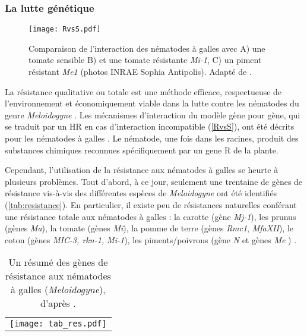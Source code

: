 	
\subsubsection{La lutte génétique}


	\begin{figure}[H]
		\centering \texttt{[image: RvsS.pdf]}
		\caption[Comparaison de
l’interaction des nématodes
à galles entre une plante
sensible et résistante]{ Comparaison de
l’interaction des nématodes
à galles avec A) une tomate
sensible B)  et une tomate
résistante   \textit{Mi-1}, C) un piment résistant \textit{Me1}  (photos
INRAE Sophia Antipolis).  Adapté de \citet{Djian-Caporalino2015}.}
 		\label{RvsS}
	\end{figure}




	La résistance qualitative ou totale est une méthode  efficace, respectueuse de l'environnement et économiquement viable dans la lutte contre les nématodes  du genre \textit{ Meloidogyne} \citep{Roberts1982, Roberts1990, Roberts1993, Williamson2009, Davies2015, Barbary2015}. Les mécanismes d'interaction du modèle gène pour gène, qui se traduit par un \gls{HR} en cas d'interaction incompatible (\autoref{RvsS}),  ont été décrits pour les nématodes à galles \citep{Kombrink2001, Pegard2005, Williamson2006}. Le nématode, une fois dans les racines, produit des substances chimiques  reconnues spécifiquement par un \gls{gene R} de la plante.


	Cependant, l'utilisation de la résistance aux nématodes  à galles se heurte à plusieurs problèmes. Tout d'abord, à
	ce jour, seulement une trentaine de  gènes de résistance vis-à-vis des différentes espèces de \textit{Meloidogyne}  ont été identifiés (\autoref{tab:resistance}). En particulier, il existe peu de résistances naturelles conférant une résistance totale aux nématodes à galles   :  la
carotte (gène \textit{Mj-1}), les prunus (gènes \textit{Ma}), la tomate
(gènes \textit{Mi}), la pomme de terre (gènes \textit{Rmc1},
\textit{MfaXII}),  le coton (gènes \textit{MIC-3,
rkn-1, Mi-1}), les piments/poivrons (gène \textit{N} et
gènes\textit{ Me} ) \citep{Djian-Caporalino2008}.

\begin{table}
	\caption[Résumé des gènes de résistance aux nématodes à galles]{Un résumé des gènes de résistance aux nématodes à  
	 galles (\textit{Meloidogyne}),  d'après \citet{Williamson2009}.}
	\centering
	\begin{tabular}{c}
	\texttt{[image: tab\_res.pdf]}\\
	\end{tabular}
	\label{tab:resistance}
\end{table}

